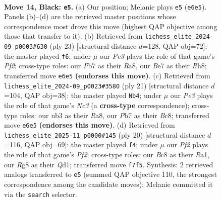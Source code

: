 \documentclass[11pt]{article}
\begin{document}
\clearpage

\begin{figure}[p]\centering
\begin{subfigure}{0.46\textwidth}\centering
\resizebox{\linewidth}{!}{%
\newchessgame
\chessboard[
  setfen={r1b2kr1/1p1qbp1p/p1n1p1p1/2Pp3n/3P4/1N6/PP1KNPPP/1RBQ1B1R b - - 5 14},
  showmover=false,
  pgfstyle=straightmove, color=movearrow, markmove={e6-e5}
]}
\caption{}
\end{subfigure}\hfill
\begin{subfigure}{0.46\textwidth}\centering
\resizebox{\linewidth}{!}{%
\newchessgame
\chessboard[
  setfen={r1b1k2r/1p1n1ppp/1qn1p3/p2pP3/1b1P1P2/5NN1/PP2B1PP/R1BQ1K1R b kq - 2 12},
  showmover=false,
  pgfstyle=straightmove, color=movearrow, markmove={f7-f6}
]}
\caption{}
\end{subfigure}
\\[4pt]
\begin{subfigure}{0.46\textwidth}\centering
\resizebox{\linewidth}{!}{%
\newchessgame
\chessboard[
  setfen={r1bqkb1r/1p3pp1/p1nppn1p/8/4PP2/1NNB4/PPPB2PP/R2QK2R b KQkq - 0 11},
  showmover=false,
  pgfstyle=straightmove, color=movearrow, markmove={c6-b4}
]}
\caption{}
\end{subfigure}\hfill
\begin{subfigure}{0.46\textwidth}\centering
\resizebox{\linewidth}{!}{%
\newchessgame
\chessboard[
  setfen={r1bqkb1r/3n1ppp/pn1pp3/1p4P1/3NP2P/P1N1B3/1PP2P2/R2QKB1R w KQkq - 3 11},
  showmover=false,
  pgfstyle=straightmove, color=movearrow, markmove={f2-f4}
]}
\caption{}
\end{subfigure}
\caption{\textbf{Move 14, Black: \texttt{e5}.} (a) Our position; Melanie plays \texttt{e5} (\texttt{e6e5}). Panels (b)--(d) are the retrieved master positions whose correspondence most drove this move (highest QAP objective among those that transfer to it). (b) Retrieved from \texttt{lichess\_elite\_2024-09\_p0003\#630} (ply 23) [structural distance $d$=128, QAP obj=72]: the master played \texttt{f6}; under $\mu$ our \emph{Pe3} plays the role of that game's \emph{Pf2}; cross-type roles: our \emph{P}b7 as their \emph{R}a8, our \emph{B}e7 as their \emph{R}h8; transferred move \texttt{e6e5} \textbf{(endorses this move)}. (c) Retrieved from \texttt{lichess\_elite\_2024-09\_p0023\#3580} (ply 21) [structural distance $d$=104, QAP obj=38]: the master played \texttt{Nb4}; under $\mu$ our \emph{Pe3} plays the role of that game's \emph{Nc3} (a \textbf{cross-type} correspondence); cross-type roles: our \emph{n}b3 as their \emph{R}a8, our \emph{P}b7 as their \emph{B}c8; transferred move \texttt{e6e5} \textbf{(endorses this move)}. (d) Retrieved from \texttt{lichess\_elite\_2025-11\_p0000\#145} (ply 20) [structural distance $d$=116, QAP obj=69]: the master played \texttt{f4}; under $\mu$ our \emph{Pf2} plays the role of that game's \emph{Pf2}; cross-type roles: our \emph{B}c8 as their \emph{R}a1, our \emph{R}g8 as their \emph{Q}d1; transferred move \texttt{f7f5}. Synthesis: 2 retrieved analogs transferred to \texttt{e5} (summed QAP objective 110, the strongest correspondence among the candidate moves); Melanie committed it via the \texttt{search} selector.}
\label{fig:thought-m27}
\end{figure}
\end{document}
